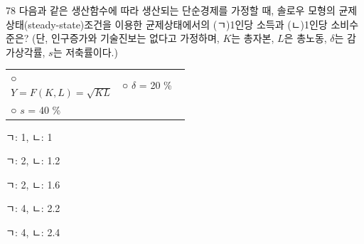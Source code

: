 \begin{question}{78}
다음과 같은 생산함수에 따라 생산되는 단순경제를 가정할 때, 솔로우 모형의 균제상태(steady-state)조건을 이용한 균제상태에서의 (ㄱ)1인당 소득과 (ㄴ)1인당 소비수준은? (단, 인구증가와 기술진보는 없다고 가정하며, $K$는 총자본, $L$은 총노동, $\delta$는 감가상각률, $s$는 저축률이다.)
\begin{framedtext}
\begin{tabular}{@{}p{0.5\linewidth}l@{}}
○ $Y = F(K, L) = \sqrt{KL}$ & ○ $\delta$ = 20 \% \\
○ $s$ = 40 \% & \\
\end{tabular}
\end{framedtext}
\begin{choices}
  \item ㄱ: 1, ㄴ: 1
  \item ㄱ: 2, ㄴ: 1.2
  \item ㄱ: 2, ㄴ: 1.6
  \item ㄱ: 4, ㄴ: 2.2
  \item ㄱ: 4, ㄴ: 2.4
\end{choices}
\end{question}
